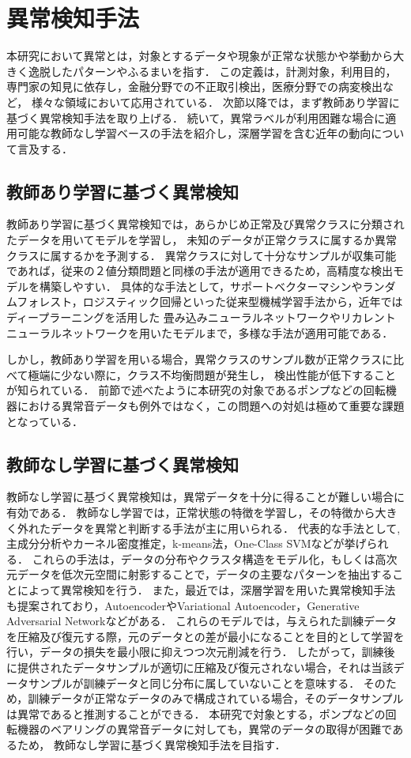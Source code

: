 \documentclass[../main]{subfiles}
\begin{document}
\section{異常検知手法}
\label{sec:related_work_anomaly}
本研究において異常とは，対象とするデータや現象が正常な状態かや挙動から大きく逸脱したパターンやふるまいを指す．
この定義は，計測対象，利用目的，専門家の知見に依存し，金融分野での不正取引検出，医療分野での病変検出など，
様々な領域において応用されている．
次節以降では，まず教師あり学習に基づく異常検知手法を取り上げる．
続いて，異常ラベルが利用困難な場合に適用可能な教師なし学習ベースの手法を紹介し，深層学習を含む近年の動向について言及する．
\subsection{教師あり学習に基づく異常検知}
教師あり学習に基づく異常検知では，あらかじめ正常及び異常クラスに分類されたデータを用いてモデルを学習し，
未知のデータが正常クラスに属するか異常クラスに属するかを予測する．
異常クラスに対して十分なサンプルが収集可能であれば，従来の２値分類問題と同様の手法が適用できるため，高精度な検出モデルを構築しやすい．
具体的な手法として，サポートベクターマシンやランダムフォレスト，ロジスティック回帰といった従来型機械学習手法から，近年ではディープラーニングを活用した
畳み込みニューラルネットワークやリカレントニューラルネットワークを用いたモデルまで，多様な手法が適用可能である．

しかし，教師あり学習を用いる場合，異常クラスのサンプル数が正常クラスに比べて極端に少ない際に，クラス不均衡問題が発生し，
検出性能が低下することが知られている．
前節で述べたように本研究の対象であるポンプなどの回転機器における異常音データも例外ではなく，この問題への対処は極めて重要な課題となっている．

\subsection{教師なし学習に基づく異常検知}
教師なし学習に基づく異常検知は，異常データを十分に得ることが難しい場合に有効である．
教師なし学習では，正常状態の特徴を学習し，その特徴から大きく外れたデータを異常と判断する手法が主に用いられる．
代表的な手法として, 主成分分析やカーネル密度推定，k-means法，One-Class SVMなどが挙げられる．
これらの手法は，データの分布やクラスタ構造をモデル化，もしくは高次元データを低次元空間に射影することで，データの主要なパターンを抽出することによって異常検知を行う．
また，最近では，深層学習を用いた異常検知手法も提案されており，AutoencoderやVariational Autoencoder，Generative Adversarial Networkなどがある．
これらのモデルでは，与えられた訓練データを圧縮及び復元する際，元のデータとの差が最小になることを目的として学習を行い，データの損失を最小限に抑えつつ次元削減を行う．
したがって，訓練後に提供されたデータサンプルが適切に圧縮及び復元されない場合，それは当該データサンプルが訓練データと同じ分布に属していないことを意味する．
そのため，訓練データが正常なデータのみで構成されている場合，そのデータサンプルは異常であると推測することができる．
本研究で対象とする，ポンプなどの回転機器のベアリングの異常音データに対しても，異常のデータの取得が困難であるため，
教師なし学習に基づく異常検知手法を目指す．
\end{document}
